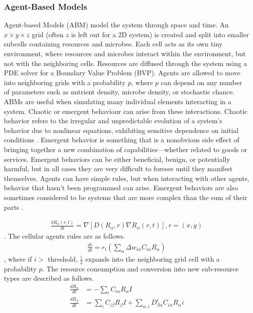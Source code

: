 \subsubsection{Agent-Based Models}
Agent-based Models (ABM) model the system through space and time. An $x \times y \times z$ grid (often $z$ is left out for a 2D system) is created and split into smaller subcells containing resources and microbes. Each cell acts as its own tiny environment, where resources and microbes interact within the environment, but not with the neighboring cells. Resources are diffused through the system using a PDE solver for a Boundary Value Problem (BVP). Agents are allowed to move into neighboring grids with a probability $p$, where $p$ can depend on any number of parameters such as nutrient density, microbe density, or stochastic chance. \newline 
ABMs are useful when simulating many individual elements interacting in a system. Chaotic or emergent behaviour can arise from these interactions. Chaotic behavior refers to the irregular and unpredictable evolution of a system's behavior due to nonlinear equations, exhibiting sensitive dependence on initial conditions \cite{encyclopedia_of_physical_science_and_technology}. \newline 
Emergent behavior is something that is a nonobvious side effect of bringing together a new combination of capabilities—whether related to goods or services. Emergent behaviors can be either beneficial, benign, or potentially harmful, but in all cases they are very difficult to foresee until they manifest themselves. Agents can have simple rules, but when interacting with other agents, behavior that hasn't been programmed can arise. Emergent behaviors are also sometimes considered to be systems that are more complex than the sum of their parts \cite{macaulayThreatsImpactsIoT2017}. 



\begin{align} 
    \frac{\delta R_\alpha(r, t)}{\delta t} = \nabla \left[D \left( R_\alpha, r\right) \nabla R_\alpha \left( r, t \right) \right], r = \left(x, y\right)
\end{align}. 
The cellular agents rules are as follows. 
\begin{align} 
    \frac{di}{dt} = r_i \left( \sum_\alpha \Delta w_{i\alpha}C_{i\alpha}R_\alpha\right)
\end{align}, where if $i>$ threshold, $\frac{i}{2}$ expands into the neighboring grid cell with a probability $p$. 
The resource consumption and conversion into new sub-resource types are described as follows. 
\begin{align}    
    \frac{dR_\alpha}{dt} &= -\sum_i C_{i\alpha}R_\alpha I \\
    \frac{dR_\beta}{dt} &= \sum_i C_{i\beta}R_\beta I + \sum_{\alpha, i}D_{\beta \alpha}^{i} C_{i \alpha} R_\alpha i
\end{align}







